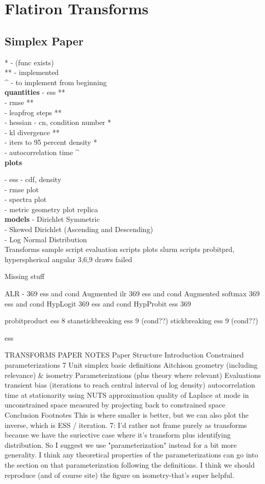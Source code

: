 \section{Flatiron Transforms}

\subsection*{Simplex Paper}
* - (func exists)\\
** - implemented\\
^ - to implement from beginning\\
\textbf{quantities}
- ess **\\
- rmse **\\
- leapfrog steps **\\
- hessian - cn, condition number *\\
- kl divergence **\\
- iters to 95 percent density *\\
- autocorrelation time ^\\

\textbf{plots}

- ess - cdf, density\\
- rmse plot\\
- spectra plot\\
- metric geometry plot replica\\

\textbf{models}
- Dirichlet Symmetric\\
- Skewed Dirichlet (Ascending and Descending)\\
- Log Normal Distribution\\


Transforms
sample script
evaluation scripts
plots
slurm scripts
probitprd, hyperspherical angular 3,6,9 draws failed

Missing stuff

ALR - 369 ess and cond
Augmented ilr 369 ess and cond
Augmented softmax 369 ess and cond
HypLogit 369 ess and cond
HypProbit ess 369

probitproduct ess 8
stanstickbreaking ess 9 (cond??)
stickbreaking ess 9 (cond??)

ess

TRANSFORMS PAPER NOTES
Paper Structure
Introduction
Constrained parameterizations 7
Unit simplex
basic definitions
Aitchison geometry (including relevance) & isometry
Parameterizations (plus theory where relevant)
Evaluations
transient bias (iterations to reach central interval of log density)
autocorrelation time at stationarity using NUTS
approximation quality of Laplace at mode in unconstrained space measured by projecting back to constrained space
Conclusion
Footnotes
This is where smaller is better, but we can also plot the inverse, which is ESS / iteration.
7: I'd rather not frame purely as transforms because we have the suriective case where it's transform plus identifying distribution. So I suggest we use "parameterization" instead for a bit more generality. I think any theoretical properties of the parameterizations can go into the section on that parameterization following the definitions. I think we should reproduce (and of course site) the figure on isometry-that's super helpful.